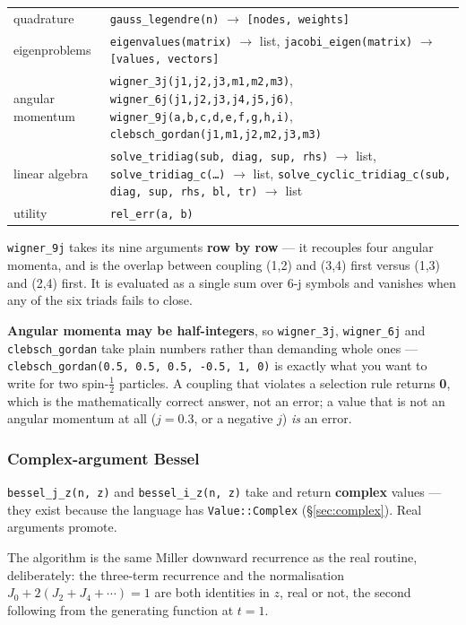\documentclass[11pt]{article}
\newcommand{\code}[1]{\texttt{#1}}
\begin{document}
\begin{center}
\begin{tabular}{lp{9.4cm}}
quadrature & \code{gauss\_legendre(n)} $\to$ \code{[nodes, weights]}\\
eigenproblems & \code{eigenvalues(matrix)} $\to$ list,
  \code{jacobi\_eigen(matrix)} $\to$ \code{[values, vectors]}\\
angular momentum & \code{wigner\_3j(j1,j2,j3,m1,m2,m3)},
  \code{wigner\_6j(j1,j2,j3,j4,j5,j6)},
  \code{wigner\_9j(a,b,c,d,e,f,g,h,i)},
  \code{clebsch\_gordan(j1,m1,j2,m2,j3,m3)}\\
linear algebra & \code{solve\_tridiag(sub, diag, sup, rhs)} $\to$ list,
  \code{solve\_tridiag\_c(\ldots)} $\to$ list,
  \code{solve\_cyclic\_tridiag\_c(sub, diag, sup, rhs, bl, tr)} $\to$ list\\
utility & \code{rel\_err(a, b)}\\
\end{tabular}
\end{center}

\code{wigner\_9j} takes its nine arguments \textbf{row by row} --- it
recouples four angular momenta, and is the overlap between coupling
(1,2) and (3,4) first versus (1,3) and (2,4) first. It is evaluated as a
single sum over 6-j symbols and vanishes when any of the six triads
fails to close.

\textbf{Angular momenta may be half-integers}, so \code{wigner\_3j},
\code{wigner\_6j} and \code{clebsch\_gordan} take plain numbers rather
than demanding whole ones --- \code{clebsch\_gordan(0.5, 0.5, 0.5, -0.5,
1, 0)} is exactly what you want to write for two spin-$\tfrac12$
particles. A coupling that violates a selection rule returns
\textbf{0}, which is the mathematically correct answer, not an error; a
value that is not an angular momentum at all ($j=0.3$, or a negative
$j$) \emph{is} an error.

\subsubsection*{Complex-argument Bessel}

\code{bessel\_j\_z(n, z)} and \code{bessel\_i\_z(n, z)} take and return
\textbf{complex} values --- they exist because the language has
\code{Value::Complex} (\S\ref{sec:complex}). Real arguments promote.

The algorithm is the same Miller downward recurrence as the real
routine, deliberately: the three-term recurrence and the normalisation
$J_0 + 2(J_2+J_4+\cdots) = 1$ are both identities in $z$, real or not,
the second following from the generating function at $t=1$.
\end{document}
